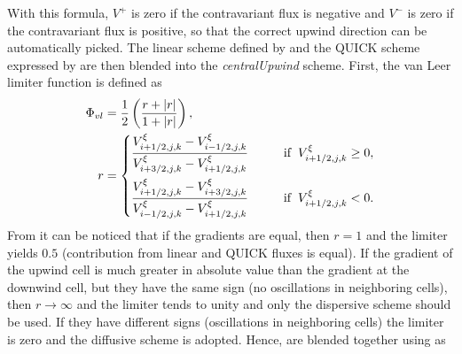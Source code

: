 With this formula, $V^+$ is zero if the contravariant flux is negative and $V^-$ is zero if the contravariant flux is positive, so that the correct upwind direction can be automatically picked. The linear scheme defined by  and the QUICK scheme expressed by  are then blended into the \textit{centralUpwind} scheme. First, the van Leer limiter function is defined as
\begin{align}
	\Phi_{vl} &= \frac{1}{2}\left(\frac{r + |r|}{1 + |r|}\right), \label{eq:vanLeerBlending1} \\
	r &= \left\{
	\begin{alignedat}{2}
		& 
		\frac{V^\xi_{i+1/2,j,k}-V^\xi_{i-1/2,j,k}}{V^\xi_{i+3/2,j,k}-V^\xi_{i+1/2,j,k}} \hspace{1cm} \text{if} \hspace{2mm} V^\xi_{i+1/2,j,k}\geq 0, \\
		&
		\frac{V^\xi_{i+1/2,j,k}-V^\xi_{i+3/2,j,k}}{V^\xi_{i-1/2,j,k}-V^\xi_{i+1/2,j,k}} \hspace{1cm} \text{if} \hspace{2mm} V^\xi_{i+1/2,j,k}< 0 .
	\end{alignedat}
    \right. 
	\label{eq:vanLeerBlending2}
\end{align}
From  it can be noticed that if the gradients are equal, then $r=1$ and the limiter yields $0.5$ (contribution from linear and QUICK fluxes is equal). If the gradient of the upwind cell is much greater in absolute value than the gradient at the downwind cell, but they have the same sign (no oscillations in neighboring cells), then $r\to\infty$ and the limiter tends to unity and only the dispersive scheme should be used. If they have different signs (oscillations in neighboring cells) the limiter is zero and the diffusive scheme is adopted. Hence,  are blended together using  as
